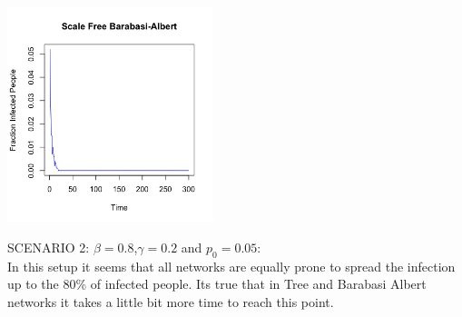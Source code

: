 \documentclass{article}
\begin{document}
\begin{center}
    \includegraphics[width=6cm]{barabasi_albert.jpeg}
    
\end{center}


\newpage
\noindent SCENARIO 2: $\beta = 0.8$,$\gamma = 0.2$ and $p_{0} = 0.05$: \\

\noindent In this setup it seems that all networks are equally prone to spread the infection up to the 80\% of infected people. Its true that in Tree and Barabasi Albert networks it takes a little bit more time to reach this point.\\
\end{document}
